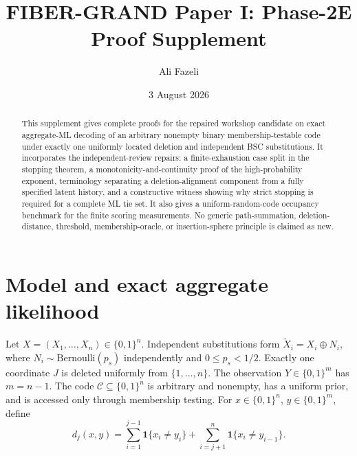 \documentclass[11pt]{article}
\title{FIBER-GRAND Paper I: Phase-2E Proof Supplement}
\author{Ali Fazeli}
\date{3 August 2026}
\theoremstyle{remark}\newtheorem{remark}[theorem]{Remark}
\newcommand{\C}{\mathcal C}\newcommand{\I}{\mathcal I}\newcommand{\one}{\mathbf 1}
\begin{document}
\maketitle
\begin{abstract}
This supplement gives complete proofs for the repaired workshop candidate on exact aggregate-ML
decoding of an arbitrary nonempty binary membership-testable code under exactly one uniformly
located deletion and independent BSC substitutions. It incorporates the independent-review repairs:
a finite-exhaustion case split in the stopping theorem, a monotonicity-and-continuity proof of the
high-probability exponent, terminology separating a deletion-alignment component from a fully
specified latent history, and a constructive witness showing why strict stopping is required for a
complete ML tie set. It also gives a uniform-random-code occupancy benchmark for the finite scoring
measurements. No generic path-summation, deletion-distance, threshold, membership-oracle, or
insertion-sphere principle is claimed as new.
\end{abstract}

\section{Model and exact aggregate likelihood}
Let $X=(X_1,\ldots,X_n)\in\{0,1\}^n$. Independent substitutions form
$\widetilde X_i=X_i\oplus N_i$, where $N_i\sim\mathrm{Bernoulli}(p_s)$ independently and
$0\le p_s<1/2$. Exactly one coordinate $J$ is deleted uniformly from $\{1,\ldots,n\}$. The
observation $Y\in\{0,1\}^{m}$ has $m=n-1$. The code $\C\subseteq\{0,1\}^n$ is arbitrary and
nonempty, has a uniform prior, and is accessed only through membership testing. For
$x\in\{0,1\}^n$, $y\in\{0,1\}^m$, define
\begin{equation}
 d_j(x,y)=\sum_{i=1}^{j-1}\one\{x_i\ne y_i\}
 +\sum_{i=j+1}^{n}\one\{x_i\ne y_{i-1}\}. \label{eq:dj}
\end{equation}
\end{document}
